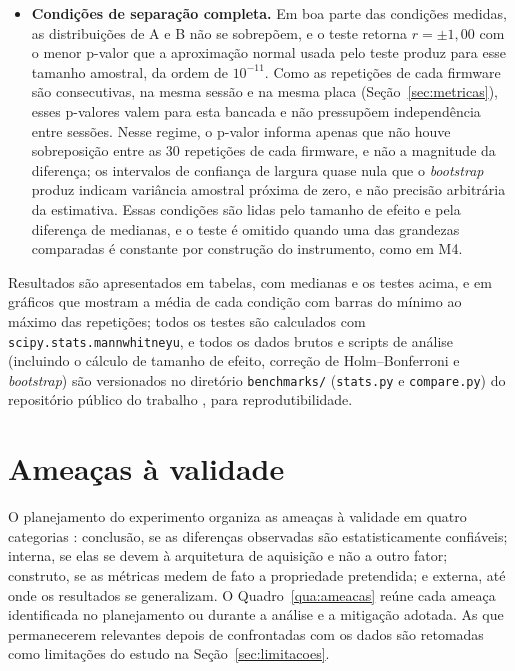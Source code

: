\begin{itemize}
  \item \textbf{Condições de separação completa.} Em boa parte das condições
        medidas, as distribuições de A e B não se sobrepõem, e o teste retorna
        $r = \pm 1{,}00$ com o menor p-valor que a aproximação normal usada pelo
        teste produz para esse tamanho amostral, da ordem de $10^{-11}$. Como as
        repetições de cada firmware são consecutivas, na mesma sessão e na mesma
        placa (Seção~\ref{sec:metricas}), esses p-valores valem para esta bancada
        e não pressupõem independência entre sessões.
        Nesse regime, o p-valor informa apenas que não houve sobreposição
        entre as 30 repetições de cada firmware, e não a magnitude da
        diferença; os intervalos de confiança de largura quase nula que o
        \emph{bootstrap} produz indicam variância amostral próxima de zero, e
        não precisão arbitrária da estimativa. Essas condições são lidas pelo
        tamanho de efeito e pela diferença de medianas, e o teste é omitido
        quando uma das grandezas comparadas é constante por construção do
        instrumento, como em M4.
\end{itemize}

Resultados são apresentados em tabelas, com medianas e os testes acima, e em
gráficos que mostram a média de cada condição com barras do mínimo ao máximo
das repetições; todos os testes são calculados com
\texttt{scipy.stats.mannwhitneyu}, e todos os dados brutos e scripts de análise
(incluindo o cálculo de tamanho de efeito, correção de Holm--Bonferroni e
\emph{bootstrap}) são versionados no diretório \texttt{benchmarks/}
(\texttt{stats.py} e \texttt{compare.py}) do repositório público do trabalho
\cite{dias2026artefatos}, para reprodutibilidade.

\section{Ameaças à validade}\label{sec:ameacas}

O planejamento do experimento organiza as ameaças à validade em quatro
categorias \cite{wohlin2012}: conclusão, se as diferenças observadas
são estatisticamente confiáveis; interna, se elas se devem à
arquitetura de aquisição e não a outro fator; construto, se as
métricas medem de fato a propriedade pretendida; e externa, até onde
os resultados se generalizam. O Quadro~\ref{qua:ameacas} reúne cada ameaça
identificada no planejamento ou durante a análise e a mitigação adotada. As que permanecerem
relevantes depois de confrontadas com os dados são retomadas como limitações
do estudo na Seção~\ref{sec:limitacoes}.

